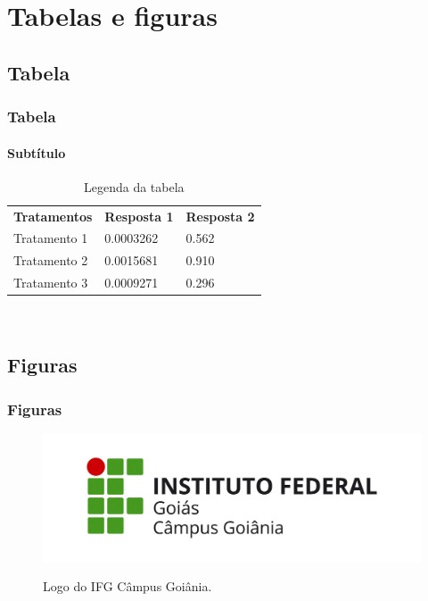 
\section{Tabelas e figuras}

\subsection{Tabela}

\begin{frame}
	\frametitle{Tabela}
	\framesubtitle{Subtítulo} %
	
	\begin{table}
		\caption{Legenda da tabela}
		\begin{tabular}{l l l}
			\textbf{Tratamentos} & \textbf{Resposta 1} & \textbf{Resposta 2}\\
			Tratamento 1 & 0.0003262 & 0.562 \\
			Tratamento 2 & 0.0015681 & 0.910 \\
			Tratamento 3 & 0.0009271 & 0.296 
		\end{tabular}\\
	\end{table}
\end{frame}


\subsection{Figuras}

\begin{frame}
	\frametitle{Figuras}
	
	\begin{figure}
		\caption{Logo do IFG Câmpus Goiânia.}
		\includegraphics[width=0.6\linewidth]{./fig/logogoiania}\\
	\end{figure}
\end{frame}